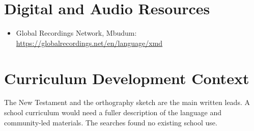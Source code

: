 \documentclass[12pt]{article}
\begin{document}
\section{Digital and Audio Resources}
\begin{itemize}
\item Global Recordings Network, Mbudum: \url{https://globalrecordings.net/en/language/xmd}
\end{itemize}

\section{Curriculum Development Context}
The New Testament and the orthography sketch are the main written leads. A school curriculum would need a fuller description of the language and community-led materials. The searches found no existing school use.
\end{document}
